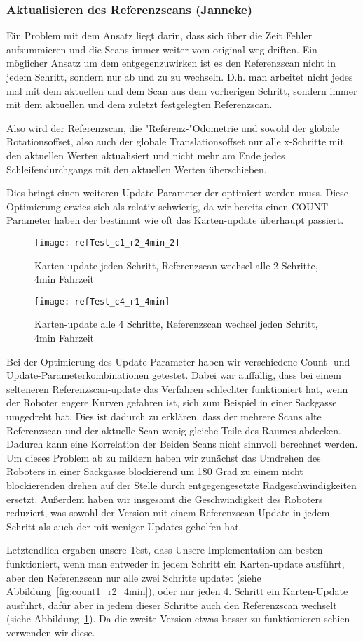 \subsubsection{Aktualisieren des Referenzscans (Janneke)}

Ein Problem mit dem Ansatz liegt darin, dass sich über die Zeit Fehler aufsummieren und die Scans immer weiter vom original weg driften. Ein möglicher Ansatz um dem entgegenzuwirken ist es den Referenzscan nicht in jedem Schritt, sondern nur ab und zu zu wechseln. D.h. man arbeitet nicht jedes mal mit dem aktuellen und dem Scan aus dem vorherigen Schritt, sondern immer mit dem aktuellen und dem zuletzt festgelegten Referenzscan.

Also wird der Referenzscan, die "Referenz-"Odometrie und sowohl der globale Rotationsoffset, also auch der globale Translationsoffset nur alle x-Schritte mit den aktuellen Werten aktualisiert und nicht mehr am Ende jedes Schleifendurchgangs mit den aktuellen Werten überschieben. 

Dies bringt einen weiteren Update-Parameter der optimiert werden muss. Diese Optimierung erwies sich als relativ schwierig, da wir bereits einen COUNT-Parameter haben der bestimmt wie oft das Karten-update überhaupt passiert.

\begin{figure}
	\centering
	\texttt{[image: refTest\_c1\_r2\_4min\_2]}
	\caption{Karten-update jeden Schritt, Referenzscan wechsel alle 2 Schritte, 4min Fahrzeit\newline}
	\label{fig:count1_r2_4min}
	\texttt{[image: refTest\_c4\_r1\_4min]}
	\caption{Karten-update alle 4 Schritte, Referenzscan wechsel jeden Schritt, 4min Fahrzeit}
	\label{fig:count4_r1_4min}
\end{figure}

Bei der Optimierung des Update-Parameter haben wir verschiedene Count- und Update-Parameterkombinationen getestet. Dabei war auffällig, dass bei einem selteneren Referenzscan-update das Verfahren schlechter funktioniert hat, wenn der Roboter engere Kurven gefahren ist, sich zum Beispiel in einer Sackgasse umgedreht hat. Dies ist dadurch zu erklären, dass der mehrere Scans alte Referenzscan und der aktuelle Scan wenig gleiche Teile des Raumes abdecken. Dadurch kann eine Korrelation der Beiden Scans nicht sinnvoll berechnet werden. Um dieses Problem ab zu mildern haben wir zunächst das Umdrehen des Roboters in einer Sackgasse blockierend um 180 Grad zu einem nicht blockierenden drehen auf der Stelle durch entgegengesetzte Radgeschwindigkeiten ersetzt. Außerdem haben wir insgesamt die Geschwindigkeit des Roboters reduziert, was sowohl der Version mit einem Referenzscan-Update in jedem Schritt als auch der mit weniger Updates geholfen hat.

Letztendlich ergaben unsere Test, dass Unsere Implementation am besten funktioniert, wenn man entweder in jedem Schritt ein Karten-update ausführt, aber den Referenzscan nur alle zwei Schritte updatet (siehe Abbildung~\ref{fig:count1_r2_4min}), oder nur jeden 4. Schritt ein Karten-Update ausführt, dafür aber in jedem dieser Schritte auch den Referenzscan wechselt (siehe Abbildung~\ref{fig:count4_r1_4min}). Da die zweite Version etwas besser zu funktionieren schien verwenden wir diese.